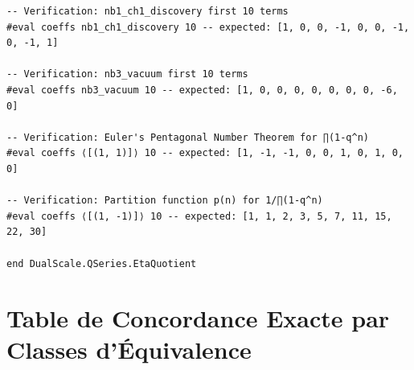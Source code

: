 \documentclass[11pt,twoside,openright]{book}
\begin{document}
\begin{verbatim}
-- Verification: nb1_ch1_discovery first 10 terms
#eval coeffs nb1_ch1_discovery 10 -- expected: [1, 0, 0, -1, 0, 0, -1, 0, -1, 1]

-- Verification: nb3_vacuum first 10 terms
#eval coeffs nb3_vacuum 10 -- expected: [1, 0, 0, 0, 0, 0, 0, 0, -6, 0]

-- Verification: Euler's Pentagonal Number Theorem for ∏(1-q^n)
#eval coeffs ⟨[(1, 1)]⟩ 10 -- expected: [1, -1, -1, 0, 0, 1, 0, 1, 0, 0]

-- Verification: Partition function p(n) for 1/∏(1-q^n)
#eval coeffs ⟨[(1, -1)]⟩ 10 -- expected: [1, 1, 2, 3, 5, 7, 11, 15, 22, 30]

end DualScale.QSeries.EtaQuotient

\end{verbatim}

\chapter{Table de Concordance Exacte par Classes d'Équivalence}
\end{document}
